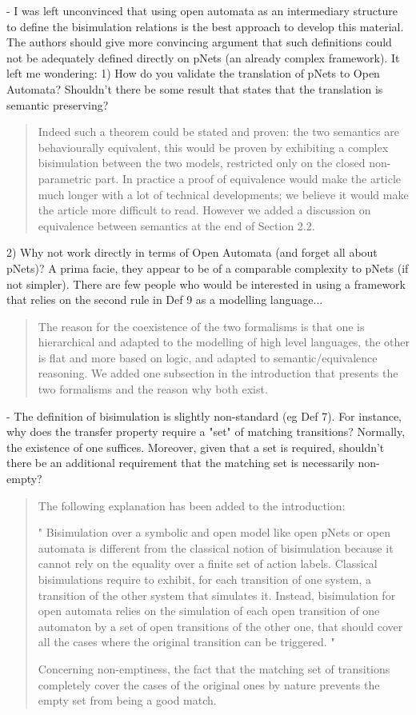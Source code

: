 \documentclass{article}
\begin{document}
- I was left unconvinced that using open automata as an intermediary structure to define the bisimulation relations is the best approach to develop this material.  The authors should give more convincing argument that such definitions could not be adequately defined directly on pNets (an already complex framework).  It left me wondering:
1) How do you validate the translation of pNets to Open Automata?  Shouldn't there be some result that states that the translation is semantic preserving?   
\begin{quote}
Indeed such a theorem could be stated and proven: the two semantics are behaviourally equivalent, this would be proven by exhibiting a complex bisimulation between the two models, restricted only on the closed non-parametric part. In practice a proof of equivalence would make the article much longer with a lot of technical developments; we believe it would make the article more difficult to read. However we added a discussion on equivalence between semantics at the end of Section 2.2.
\end{quote}
 
2) Why not work directly in terms of Open Automata (and forget all about pNets)?  A prima facie, they appear to be of a comparable complexity to pNets (if not simpler).  There are few people who would be interested in using a framework that relies on the second rule in Def 9 as a modelling language...  
\begin{quote}
The reason for the coexistence of the two formalisms is that one is hierarchical and adapted to the modelling of high level languages, the other is flat and more based on logic, and adapted to semantic/equivalence reasoning.
We added one subsection in the introduction that presents the two formalisms and the reason why both exist.
\end{quote}

- The definition of bisimulation is slightly non-standard (eg Def 7).  For instance, why does the transfer property require a "set" of matching transitions?  Normally, the existence of one suffices.  Moreover, given that a set is required, shouldn't there be an additional requirement that the matching set is necessarily non-empty? 

\begin{quote}
The following explanation has been added to the introduction:

" Bisimulation over a symbolic and open model like open pNets or open automata is  different from the classical notion of bisimulation because it cannot rely on the equality over a finite set of action labels. Classical bisimulations require to exhibit, for each transition of one system, a transition of the other system that simulates it. Instead, bisimulation for open automata  relies on the simulation of each open transition of one automaton by a set of open transitions of the other one, that should cover all the 
cases where the original transition can be triggered.
"

Concerning non-emptiness, the fact that the matching set of transitions completely cover the cases of the original ones by nature prevents the empty set from being a good match. 
\end{quote}
\end{document}
